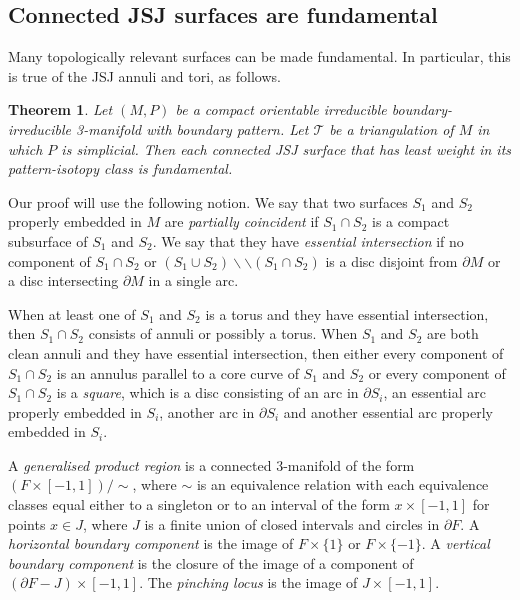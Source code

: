 \documentclass[oneside]{amsart}
\numberwithin{equation}{section}
\theoremstyle{plain}
\newtheorem{theorem}[equation]{Theorem}
\theoremstyle{definition}
\newcommand{\cut}{\backslash\backslash}
\begin{document}
\subsection{Connected JSJ surfaces are fundamental}

Many topologically relevant surfaces can be made fundamental. In particular, this is true of the JSJ annuli
and tori, as follows. 

\begin{theorem}
\label{Thm:JSJFundamental}
Let $(M,P)$ be a compact orientable irreducible boundary-irreducible 3-manifold with boundary pattern.
Let $\mathcal{T}$ be a triangulation of $M$ in which $P$ is simplicial. Then each connected JSJ surface 
that has least weight in its pattern-isotopy class is fundamental.
\end{theorem}

Our proof will use the following notion. We say that
two surfaces $S_1$ and $S_2$ properly embedded in $M$ are \emph{partially coincident} if $S_1 \cap S_2$ is a compact subsurface of $S_1$ and $S_2$.
We say that they have \emph{essential intersection} if no component of $S_1 \cap S_2$ or $(S_1 \cup S_2) \cut (S_1 \cap S_2)$ is a disc disjoint from $\partial M$ or a disc intersecting $\partial M$ in a single arc.

When at least one of $S_1$ and $S_2$ is a torus and they have essential intersection, then $S_1 \cap S_2$ consists of annuli or possibly a torus. When $S_1$ and $S_2$ are both clean annuli and they have essential intersection, then either every component of $S_1 \cap S_2$ is an annulus parallel to a core curve of $S_1$ and $S_2$ or every component of $S_1 \cap S_2$ is a \emph{square}, which is a disc consisting of an arc in $\partial S_i$, an essential arc properly embedded in $S_i$, another arc in $\partial S_i$ and another essential arc properly embedded in $S_i$.

A \emph{generalised product region} is a connected 3-manifold of the form $(F \times [-1,1]) / \! \sim$, where $\sim$ is an equivalence relation with each equivalence classes equal either to a singleton or to an interval of the form $x \times [-1,1]$ for points $x \in J$, where $J$ is a finite union of closed intervals and circles in $\partial F$. A \emph{horizontal boundary component} is the image of $F \times \{1\}$ or $F \times \{ -1 \}$. A \emph{vertical boundary component} is the closure of the image of a component of $(\partial F - J) \times [-1,1]$. The \emph{pinching locus} is the image of $J \times [-1, 1]$.
\end{document}

